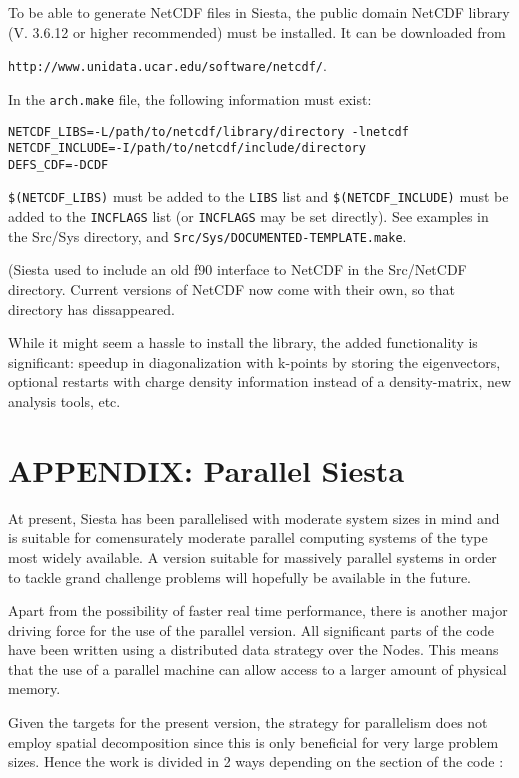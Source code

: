 \documentclass[11pt]{article}
\begin{document}
To be able to generate NetCDF files in {\sc Siesta}, the public domain
NetCDF library (V. 3.6.12 or higher recommended) must be installed. It can be
downloaded from 

{\tt http://www.unidata.ucar.edu/software/netcdf/}.

In the {\tt arch.make} file, the following information must exist:
\begin{verbatim}
NETCDF_LIBS=-L/path/to/netcdf/library/directory -lnetcdf
NETCDF_INCLUDE=-I/path/to/netcdf/include/directory
DEFS_CDF=-DCDF
\end{verbatim}
{\tt \$(NETCDF\_LIBS)} must be added to the {\tt LIBS} list and
{\tt \$(NETCDF\_INCLUDE)} must be added to the {\tt INCFLAGS} list (or
{\tt INCFLAGS} may be set directly). See examples in the Src/Sys
directory, and {\tt Src/Sys/DOCUMENTED-TEMPLATE.make}.


({\sc Siesta} used to include an old f90 interface to NetCDF in the
Src/NetCDF directory. Current versions of NetCDF now come with their
own, so that directory has dissappeared.

While it might seem a hassle to install the library, the added
functionality is significant: speedup in diagonalization with k-points
by storing the eigenvectors, optional restarts with charge density
information instead of a density-matrix,  new analysis tools, etc.


\newpage
\section{APPENDIX: Parallel {\sc Siesta}}
\label{sec:parallel}

At present, {\sc Siesta} has been parallelised with moderate system sizes
in mind and is suitable for comensurately moderate parallel computing
systems of the type most widely available. A version suitable for
massively parallel systems in order to tackle grand challenge problems
will hopefully be available in the future.

Apart from the possibility of faster real time performance, there is
another major driving force for the use of the parallel version. All
significant parts of the code have been written using a distributed
data strategy over the Nodes. This means that the use of a parallel
machine can allow access to a larger amount of physical memory.

Given the targets for the present version, the strategy for parallelism
does not employ spatial decomposition since this is only beneficial for
very large problem sizes. Hence the work is divided in 2 ways depending
on the section of the code :
\end{document}
